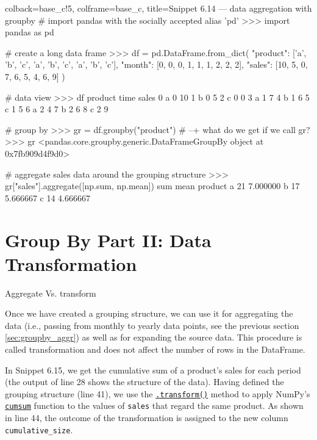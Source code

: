 \documentclass[a4paper,11pt]{book}
\newcommand{\question}[1]{%
    \begin{tcolorbox}[colback=comp_c!10,colframe=comp_c,sidebyside align=top,width=\linewidth,before skip=1ex]
        #1
    \end{tcolorbox}
    \switchcolumn%
}
\newcommand{\note}[1]{%
    \begin{tcolorbox}[colback=white!0,colframe=white!10,width=\linewidth,before skip=1ex]
        #1
    \end{tcolorbox}
}
\begin{document}
\begin{pythoncode}[linenos=True]{colback=base_c!5, colframe=base_c, title=\sffamily Snippet 6.14 --- data aggregation with groupby}
# import pandas with the socially accepted alias 'pd'
>>> import pandas as pd

# create a long data frame
>>> df = pd.DataFrame.from_dict(
	{
	    "product": ['a', 'b', 'c', 'a', 'b', 'c', 'a', 'b', 'c'],	
	    "month": [0, 0, 0, 1, 1, 1, 2, 2, 2],
	    "sales": [10,  5,  0,  7,  6,  5,  4,  6,  9]
	}
    )

# data view
>>> df
  product  time  sales
0       a     0     10
1       b     0      5
2       c     0      0
3       a     1      7
4       b     1      6
5       c     1      5
6       a     2      4
7       b     2      6
8       c     2      9

# group by
>>> gr = df.groupby("product")
# --+ what do we get if we call gr?
>>> gr
<pandas.core.groupby.generic.DataFrameGroupBy object at 0x7fb909d4f9d0>

# aggregate sales data around the grouping structure
>>> gr["sales"].aggregate([np.sum, np.mean])
         sum      mean
product               
a         21  7.000000
b         17  5.666667
c         14  4.666667
\end{pythoncode}
\clearpage
\section{Group By Part II: Data Transformation}
\label{sec:groupby_transform}

\begin{paracol}{2}
	\question{\raggedright Aggregate Vs. transform}
	\note{Once we have created a grouping structure, we can use it for aggregating the data (i.e., passing from monthly to yearly data points, see the previous section \ref{sec:groupby_aggr}) as well as for expanding the source data. This procedure is called transformation and does not affect the number of rows in the DataFrame.
	
	\quad In Snippet 6.15, we get the cumulative sum of a product's sales for each period (the output of line 28 shows the structure of the data). Having defined the grouping structure (line 41), we use the \href{https://pandas.pydata.org/docs/reference/api/pandas.DataFrame.transform.html?highlight=transform#pandas.DataFrame.transform}{\texttt{.transform()}} method to apply NumPy's \href{https://numpy.org/doc/stable/reference/generated/numpy.cumsum.html}{\texttt{cumsum}} function to the values of \texttt{sales} that regard the same product. As shown in line 44, the outcome of the transformation is assigned to the new column \texttt{cumulative\_size}.
	}
\end{paracol}
\end{document}
